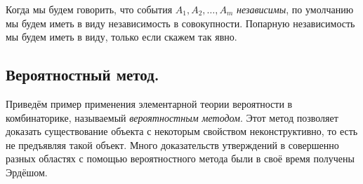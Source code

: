 \documentclass[../main.tex]{subfiles}
\begin{document}
\begin{conventn*}
 Когда мы будем говорить, что события $ A_1, A_2, \ldots, A_m $ \textit{независимы}, по умолчанию мы будем иметь в виду независимость в совокупности. Попарную независимость мы будем иметь в виду, только если скажем так явно.
\end{conventn*}

\subsection{Вероятностный метод.}

Приведём пример применения элементарной теории вероятности в комбинаторике, называемый \textit{вероятностным методом}. Этот метод позволяет доказать существование объекта с некоторым свойством неконструктивно, то есть не предъявляя такой объект. Много доказательств утверждений в совершенно разных областях с помощью вероятностного метода были в своё время получены Эрдёшом.
\end{document}
